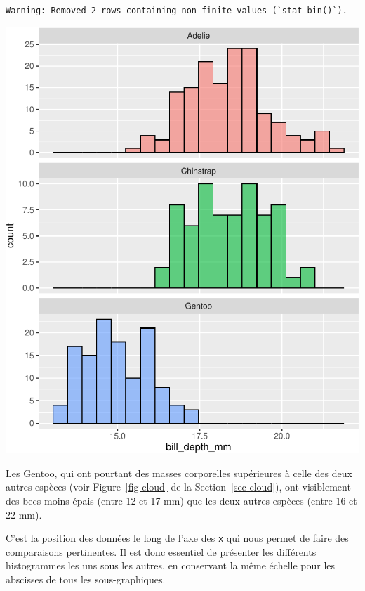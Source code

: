 \documentclass[
  a4paper,
  DIV=11,
  numbers=noendperiod,
  oneside]{scrreprt}
\begin{document}
\begin{verbatim}
Warning: Removed 2 rows containing non-finite values (`stat_bin()`).
\end{verbatim}

\includegraphics{03-visualization_files/figure-pdf/unnamed-chunk-69-1.pdf}

Les Gentoo, qui ont pourtant des masses corporelles supérieures à celle
des deux autres espèces (voir Figure~\ref{fig-cloud} de la
Section~\ref{sec-cloud}), ont visiblement des becs moins épais (entre 12
et 17 mm) que les deux autres espèces (entre 16 et 22 mm).

\begin{tcolorbox}[enhanced jigsaw, colbacktitle=quarto-callout-important-color!10!white, left=2mm, leftrule=.75mm, titlerule=0mm, bottomtitle=1mm, colback=white, breakable, arc=.35mm, bottomrule=.15mm, toprule=.15mm, toptitle=1mm, opacitybacktitle=0.6, title=\textcolor{quarto-callout-important-color}{\faExclamation}\hspace{0.5em}{Important}, coltitle=black, rightrule=.15mm, opacityback=0, colframe=quarto-callout-important-color-frame]

C'est la position des données le long de l'axe des \texttt{x} qui nous
permet de faire des comparaisons pertinentes. Il est donc essentiel de
présenter les différents histogrammes les uns sous les autres, en
conservant la même échelle pour les abscisses de tous les
sous-graphiques.

\end{tcolorbox}
\end{document}
